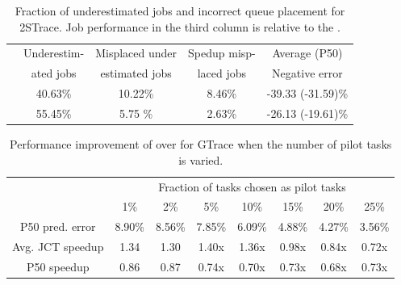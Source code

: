 \begin{table}
\caption{Fraction of underestimated jobs and incorrect queue placement for 2STrace. Job performance in the third column is relative to the \oracle. }
  \label{table:sim:underestimatedJobs}
\vspace{-0.1in}	
  \centering
      {\small
	\begin{tabular}{|c|c|c|c|c|} 
	  \hline
		& Underestim- & Misplaced under & Spedup misp- & Average (P50)\\
		& ated jobs & estimated jobs & laced jobs & Negative error\\
	  \hline
		\primarybase & 40.63\% & 10.22\% & 8.46\% & -39.33 (-31.59)\%\\
	  \hline
	  	\slearn & 55.45\% & 5.75 \% & 2.63\% & -26.13 (-19.61)\% \\
	  \hline
	\end{tabular}
      }
\vspace{-0.1in}	
\end{table}
\fi





\begin{table}[tp]
	\centering
\caption{Performance improvement of \slearn over \primarybase for GTrace when the number of pilot
  tasks is varied.
}
\label{table:sim:numPilots:GTrace}
\vspace{-0.25in}
{\small	
	\begin{tabular}{cccccccc}
		\\ \Xhline{3\arrayrulewidth}
			 & \multicolumn{7}{c}{Fraction of tasks chosen as pilot tasks}      \\
		&1\%&2\%&5\%&10\%&15\%&20\%&25\%	\\  \Xhline{3\arrayrulewidth}
		P50 pred. error \hspace{-0.1in}&8.90\%&8.56\%&7.85\%&6.09\%&4.88\%&4.27\%&3.56\%                                    \\
		Avg. JCT speedup \hspace{-0.1in}&1.34&1.30&1.40x&1.36x&0.98x&0.84x&0.72x  \\
		P50 speedup\hspace{-0.1in}&0.86&0.87&0.74x&0.70x&0.73x&0.68x&0.73x \\
\hline
	\end{tabular}
}
\vspace{-0.1in}
\end{table}
\fi


